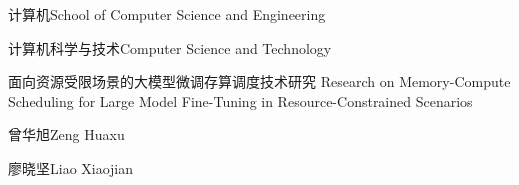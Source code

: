 
\school
{计算机}{School of Computer Science and Engineering}

\major
{计算机科学与技术}{Computer Science and Technology}

\thesistitle
{面向资源受限场景的大模型微调存算调度技术研究}
{}
{Research on Memory-Compute Scheduling for Large Model Fine-Tuning in Resource-Constrained Scenarios}
{}

\thesisauthor
{曾华旭}{Zeng Huaxu}

\teacher
{廖晓坚}{Liao Xiaojian}






